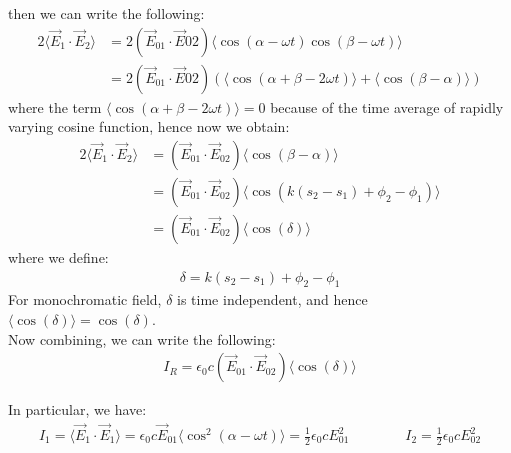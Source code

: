 \documentclass[11pt]{book}
\theoremstyle{break}
\theoremstyle{break}
\begin{document}
then we can write the following:
\begin{align*}
2\langle\vec{E}_{1}\cdot \vec{E}_{2}\rangle 
&= 2\left(\vec{E}_{01}\cdot \vec{E}{02}\right) \langle\cos(\alpha - \omega t) \cos(\beta - \omega t)\rangle\\
&= 2\left(\vec{E}_{01}\cdot \vec{E}{02}\right) \left( \langle \cos(\alpha+\beta - 2\omega t)\rangle + \langle \cos(\beta - \alpha) \rangle\right)
\end{align*}
where the term $\langle \cos(\alpha+\beta - 2\omega t)\rangle = 0$ because of the time average of rapidly varying cosine function, hence now we obtain:
\begin{align*}
2\langle\vec{E}_1 \cdot \vec{E}_2\rangle &= 
\left(\vec{E}_{01}\cdot \vec{E}_{02}\right) \langle \cos(\beta - \alpha)\rangle\\
&= \left(\vec{E}_{01}\cdot \vec{E}_{02}\right)\langle \cos(k(s_2 - s_1) + \phi_2 - \phi_1)\rangle\\
&= \left(\vec{E}_{01}\cdot \vec{E}_{02}\right)\langle \cos(\delta)\rangle
\end{align*}
where we define: 
\begin{align}
\delta = k(s_2-s_1)+\phi_2 - \phi_1
\end{align}
For monochromatic field, $\delta$ is time independent, and hence $\langle \cos(\delta) \rangle = \cos(\delta)$.\\
Now combining, we can write the following:
\begin{align*}
I_R = \epsilon_0 c \left( \vec{E}_{01}\cdot \vec{E}_{02}\right) \langle \cos(\delta) \rangle
\end{align*}

In particular, we have:
\begin{align*}
I_1 = \langle \vec{E}_1 \cdot \vec{E}_1 \rangle = \epsilon_0 c \vec{E}_{01}\langle \cos^2(\alpha - \omega t)\rangle  = \frac{1}{2}\epsilon_0 c E_{01}^2\qquad\qquad I_2 = \frac{1}{2}\epsilon_0 c E_{02}^2
\end{align*}
\end{document}
